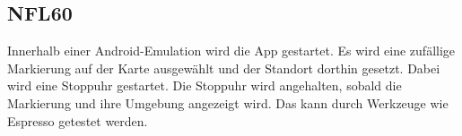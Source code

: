 \subsection*{NFL60}

Innerhalb einer \Gls{Android}-\Gls{Emulation} wird die App gestartet.
Es wird eine zufällige Markierung auf der Karte ausgewählt und der Standort dorthin gesetzt. 
Dabei wird eine Stoppuhr gestartet.
Die Stoppuhr wird angehalten, sobald die Markierung und ihre Umgebung angezeigt wird.
Das kann durch Werkzeuge wie \Gls{Espresso} getestet werden.